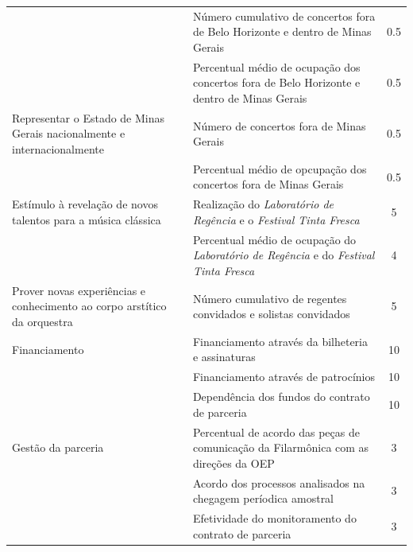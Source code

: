 \documentclass[a4paper, 12pt, openright, oneside, german, french, english, brazil]{abntex2}
\begin{document}
\begin{SingleSpace}
\begin{footnotesize}
\begin{center}
\begin{longtable}{p{6cm} p{7cm} c}
				& Número cumulativo de concertos fora de Belo Horizonte e dentro de Minas Gerais & 0.5 \\
				& Percentual médio de ocupação dos concertos fora de Belo Horizonte e dentro de Minas Gerais & 0.5 \\
				\hline
				Representar o Estado de Minas Gerais nacionalmente e internacionalmente & Número de concertos fora de Minas Gerais & 0.5 \\
				& Percentual médio de opcupação dos concertos fora de Minas Gerais & 0.5 \\
				\hline
				Estímulo à revelação de novos talentos para a música clássica & Realização do \textit{Laboratório de Regência} e o \textit{Festival Tinta Fresca} & 5 \\
				& Percentual médio de ocupação do \textit{Laboratório de Regência} e do \textit{Festival Tinta Fresca} & 4 \\
				\hline
				Prover novas experiências e conhecimento ao corpo arstítico da orquestra & Número cumulativo de regentes convidados e solistas convidados & 5 \\
				\hline
				Financiamento & Financiamento através da bilheteria e assinaturas & 10 \\
				& Financiamento através de patrocínios & 10 \\
				& Dependência dos fundos do contrato de parceria & 10 \\
				\hline
				Gestão da parceria & Percentual de acordo das peças de comunicação da Filarmônica com as direções da OEP & 3 \\
				& Acordo dos processos analisados na chegagem períodica amostral & 3 \\
				& Efetividade do monitoramento do contrato de parceria & 3 \\
			\end{longtable}
		\end{center}
	\end{footnotesize}
\end{SingleSpace}

	
	
	
\end{document}
